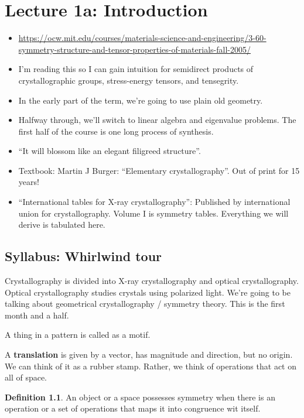 \documentclass{book}
\theoremstyle{definition}
\newtheorem{definition}[theorem]{Definition}
\begin{document}
\chapter{Lecture 1a: Introduction}
\begin{itemize}
\item \href{MIT 3.60: Symmetry, Structure, and Tensor Properties of Materials}{https://ocw.mit.edu/courses/materials-science-and-engineering/3-60-symmetry-structure-and-tensor-properties-of-materials-fall-2005/}
\item I'm reading this so I can gain intuition for semidirect products of
      crystallographic groups, stress-energy tensors, and tensegrity.
\item In the early part of the term, we're going to use plain old geometry.
\item Halfway through, we'll switch to linear algebra and eigenvalue problems.
      The first half of the course is one long process of synthesis.
\item ``It will blossom like an elegant filigreed structure''.
\item Textbook: Martin J Burger: ``Elementary crystallography''. Out of print
   for 15 years!
\item ``International tables for X-ray crystallography'': Published by
  international union for crystallography. Volume I is symmetry tables. Everything
  we will derive is tabulated here.
\end{itemize}

\section{Syllabus: Whirlwind tour}
Crystallography is divided into X-ray crystallography and optical crystallography.
Optical crystallography studies crystals using polarized light. We're going to be
talking about geometrical crystallography / symmetry theory. This is the first
month and a half.

A thing in a pattern is called as a motif.

A \textbf{translation} is given by a vector, has magnitude and direction, but no origin.
We can think of it as a rubber stamp. Rather, we think of operations that act on all of space.
\begin{definition}
An object or a space possesses symmetry when there is an operation or a set of
operations that maps it into congruence wit itself.
\end{definition}
\end{document}
